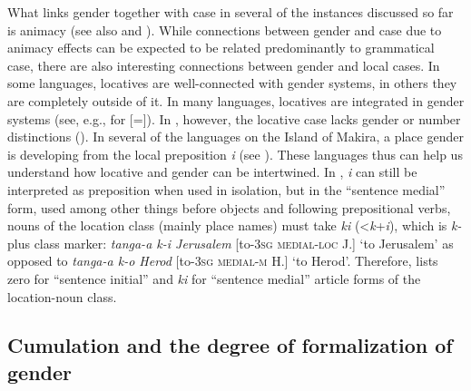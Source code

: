 \documentclass[output=collectionpaper]{langsci/langscibook}
\begin{document}
What links gender together with case in several of the instances discussed so far is animacy (see also  and ). While connections between gender and case due to animacy effects can be expected to be related predominantly to grammatical case, there are also interesting connections between gender and local cases. In some languages, locatives are well-connected with gender systems, in others they are completely outside of it. In many  languages, locatives are integrated in gender systems (see, e.g., \citealt{Bresnan1989} for  [=]). In , however, the locative case lacks gender or number distinctions (\citealt[12]{Thomason2003}). In several of the  languages on the Island of Makira, a place gender is developing from the local preposition \textit{i} (see ). These languages thus can help us understand how locative and gender can be intertwined. In , \textit{i} can still be interpreted as preposition when used in isolation, but in the ``sentence medial'' form, used among other things before objects and following prepositional verbs, nouns of the location class (mainly place names) must take \textit{ki} (<\textit{k}+\textit{i}), which is \textit{k-} plus class marker: \textit{tanga-a k-i Jerusalem} [to-\textsc{3sg} \textsc{medial-loc} J.] `to Jerusalem' as opposed to \textit{tanga-a k-o Herod} [to-\textsc{3sg medial-m} H.] `to Herod'. Therefore, \cite[26]{Mellow2013} lists zero for ``sentence initial'' and \textit{ki} for ``sentence medial'' article forms of the location-noun class.


  \subsection{Cumulation and the degree of formalization of gender}
  \label{sec:WDG:8.3}
\end{document}
